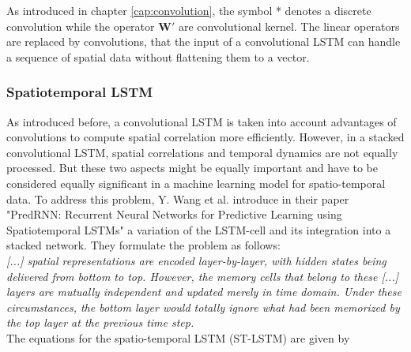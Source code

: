 As introduced in chapter \ref{cap:convolution}, the symbol * denotes a discrete convolution while the operator $\textbf{W}'$ are convolutional kernel. The linear operators are replaced by convolutions, that the input of a convolutional LSTM can handle a sequence of spatial data without flattening them to a vector.

\subsubsection{Spatiotemporal LSTM} \label{cap:STLSTM}
As introduced before, a convolutional LSTM is taken into account advantages of convolutions to compute spatial correlation more efficiently. However, in a stacked convolutional LSTM, spatial correlations and temporal dynamics are not equally processed.
But these two aspects might be equally important and have to be considered equally significant in a machine learning model for spatio-temporal data. To address this problem, Y. Wang et al. introduce in their paper "PredRNN: Recurrent Neural Networks for Predictive
Learning using Spatiotemporal LSTMs" \cite{prednet} a variation of the LSTM-cell and its integration into a stacked network. They formulate the problem as follows:\\
\textit{[...] spatial representations are encoded layer-by-layer, with hidden states being delivered from bottom to top. However, the memory cells that belong to these [...] layers are mutually independent and updated merely in time domain. Under these circumstances, the bottom layer would totally ignore what had been memorized by the top layer at the previous time step.}\\

The equations for the spatio-temporal LSTM (ST-LSTM) are given by


